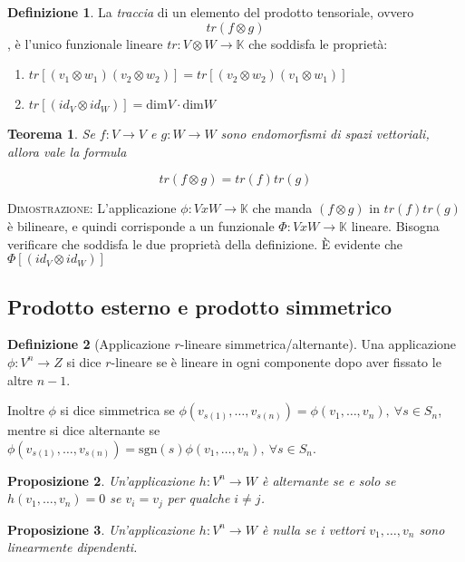 \documentclass[11pt]{article}
\theoremstyle{plain}
\newtheorem{thm}{Teorema}[section]
\newtheorem{prop}[thm]{Proposizione}
\theoremstyle{definition}
\newtheorem{defn}{Definizione}[section]
\theoremstyle{remark}
\newcommand{\K}{\mathbb{K}}
\begin{document}
\begin{defn}
La \emph{traccia} di un elemento del prodotto tensoriale, ovvero 
\[ tr(f\otimes g)\], 
è l'unico funzionale lineare $tr: V \otimes W \to \K$ che soddisfa le proprietà:
\begin{enumerate}
\item $tr[ (v_1 \otimes w_1) (v_2 \otimes w_2) ] = tr[ (v_2 \otimes w_2) (v_1 \otimes w_1) ] $ 
\item $tr[ (id_V \otimes id_W)  ]  = \mbox{dim} V \cdot \mbox{dim} W $
\end{enumerate}
\end{defn}


\begin{thm}
Se $f:V\to V$ e $g:W\to W$ sono endomorfismi di spazi vettoriali, allora vale la formula

\[tr(f\otimes g) = tr(f) tr(g)  \]

\end{thm}

\textsc{Dimostrazione:} L'applicazione $\phi: V x W \to \K$ che manda $(f\otimes g)$ in $tr(f) tr(g)$ è bilineare, e quindi corrisponde a un funzionale $\Phi: V x W \to \K$ lineare. Bisogna verificare che soddisfa le due proprietà della definizione.  È evidente che $\Phi[ (id_V \otimes id_W)  ]  $ 


\subsection{Prodotto esterno e prodotto simmetrico}

\begin{defn}[Applicazione $r$-lineare simmetrica/alternante]
 Una applicazione $\phi: V^n \to Z$ si dice $r$-lineare se è lineare in ogni componente dopo aver fissato le altre $n-1$.

 Inoltre $\phi$ si dice simmetrica se $\phi(v_{s(1)},\ldots,v_{s(n)})=\phi(v_1,\ldots,v_n),\ \forall s \in S_n$, mentre si dice 
 alternante se $\phi(v_{s(1)},\ldots,v_{s(n)})=\mathrm{sgn}(s)\phi(v_1,\ldots,v_n),\ \forall s \in S_n$.
 
\end{defn}

\begin{prop}
 Un'applicazione $h: V^n \to W$ è alternante se e solo se $h(v_1,\ldots,v_n)=0$ se $v_i=v_j$ per qualche $i\neq j$.
 \end{prop}

 \begin{prop}
  Un'applicazione $h: V^n \to W$ è nulla se i vettori $v_1,\ldots,v_n$ sono linearmente dipendenti.
 \end{prop}
\end{document}
